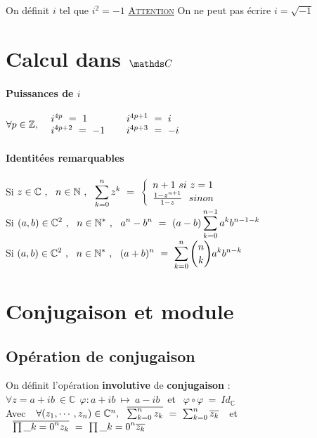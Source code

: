 
 
 On définit $i$ tel que $i^2 = -1$ \hspace*{20pt} \underline{\textsc{Attention}} On ne peut pas écrire $i = \sqrt{-1}$
 \minitoc
 \section{Calcul dans $\C$}
 \paragraph{Puissances de $i$}
 $\forall p\in \mathbb{Z} , ~~\ar* i^{4p} ~=~ 1 \hspace*{40pt} i^{4p+1} ~=~ i \\ i^{4p+2} ~=~ -1 \hspace*{22pt} i^{4p+3} ~=~ -i \ar$
 \paragraph{Identitées remarquables} ${}$\\
 \hspace*{25pt} Si $\cm{z\in\mathbb{C} ~,~~ n\in\mathbb{N} ~,~~ \sk{0}{n} z^k ~=~ \left\{ \ar* n+1 ~si~ z=1 \\ \frac{1-z^{n+1}}{1-z} ~~sinon \ar\right.}$ \\
 \hspace*{25pt} Si $\displaystyle{ (a,b)\in\mathbb{C}^2 ~,~~ n\in\mathbb{N}^* ~,~~ a^n -b^n ~=~ (a-b) \sum_{k= 0 }^{n-1} a^k b^{n-1-k}  }$\\
 \hspace*{25pt} Si $\displaystyle{ (a,b)\in\mathbb{C}^2 ~,~~ n\in\mathbb{N}^* ~,~~ (a+b)^n ~=~ \sum_{k= 0 }^{n} \binom{n}{k} a^k b^{n-k} }$
 \section{Conjugaison et module}
 \subsection{Opération de conjugaison}
 On définit l'opération \textbf{involutive} de \textbf{conjugaison} :\\ $\forall z=a+ib ~\in\mathbb{C} ~~\varphi : a+ib ~\mapsto  ~a-ib~~$ et $~~ \varphi \circ \varphi ~=~ Id_{\mathbb{C}}$\vspace*{10pt}\\
 Avec $~~\forall (z_1, \cdots , z_n) \in\mathbb{C}^n ,~~ \overline{\sum_{k= 0 }^{n} z_k} ~=~ \sum_{k= 0 }^{n} \overline{z_k}~~$ et $~~ \overline{\prod\_{k= 0 }^{n} z_k} ~=~ \prod\_{k= 0 }^{n} \overline{z_k}$

